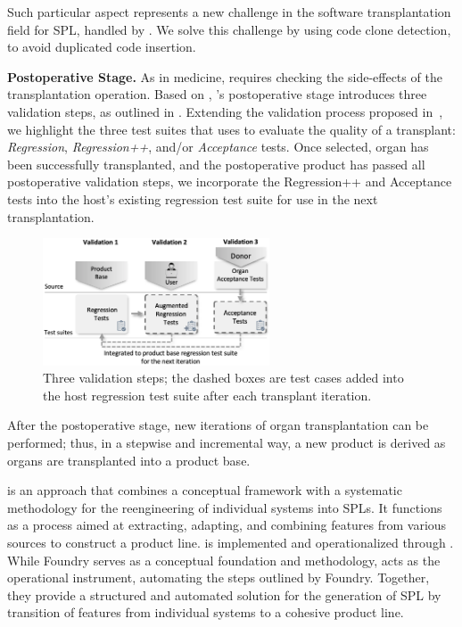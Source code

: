 Such particular aspect represents a new challenge in the software transplantation field for SPL, handled by \FOUNDRY. 
We solve this challenge by using code clone detection, to avoid duplicated code insertion.

\textbf{Postoperative Stage.} As in medicine, \FOUNDRY requires checking the side-effects of the transplantation operation. Based on \cite{Barr2015}, \FOUNDRY's postoperative stage introduces three validation steps, as outlined in . Extending the validation process proposed in~\cite{Harman2013, Barr2015}, we highlight the three test suites that \FOUNDRY uses to evaluate the quality of a transplant: \emph{Regression}, \emph{Regression++}, and/or \emph{Acceptance} tests.
Once selected, organ has been successfully transplanted, and the postoperative product has passed all postoperative validation steps, we incorporate the Regression++ and Acceptance tests into the host's existing regression test suite for use in the next transplantation.

\begin{figure}[t]
\centering \includegraphics[width=0.6\textwidth]{images/postoperative_tests2.png}
\caption{Three validation steps; the dashed boxes are test cases added into the host regression test suite after each transplant iteration.}
\label{fig:postoperative_tests}
\end{figure} 

After the postoperative stage, new iterations of organ transplantation can be performed; thus, in a stepwise and incremental way, a new product is derived as organs are transplanted into a product base. 

\FOUNDRY is an approach that combines a conceptual framework with a systematic methodology for the reengineering of individual systems into SPLs. It functions as a process aimed at extracting, adapting, and combining features from various sources to construct a product line. \FOUNDRY is implemented and operationalized through \prodscalpel. While Foundry serves as a conceptual foundation and methodology, \prodscalpel acts as the operational instrument, automating the steps outlined by Foundry. Together, they provide a structured and automated solution for the generation of SPL by transition of features from individual systems to a cohesive product line.
